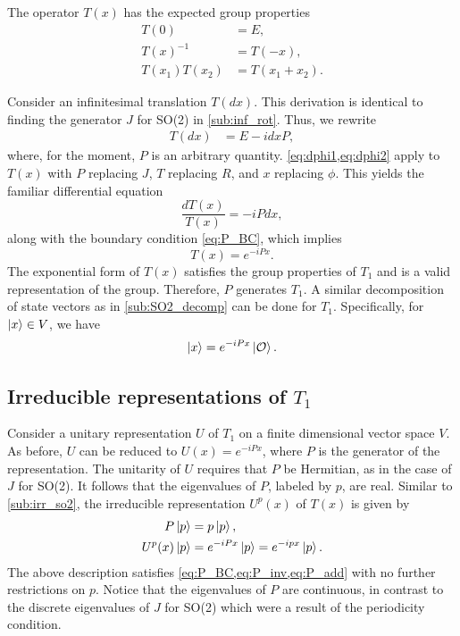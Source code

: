     The operator $T(x)$ has the expected group properties
    \begin{align}
        T(0) &= E, \label{eq:P_BC} \\
        T(x)^{-1} &= T(-x), \label{eq:P_inv}\\
        T(x_1)T(x_2) &= T(x_1+x_2).\label{eq:P_add}
    \end{align}

    Consider an infinitesimal translation $T(dx)$. This derivation is identical to finding the generator $J$ for SO(2) in \cref{sub:inf_rot}. Thus, we rewrite
    \begin{align*}
        T(dx) &= E - i dx P,
    \end{align*}
    where, for the moment, $P$ is an arbitrary quantity. \cref{eq:dphi1,eq:dphi2} apply to $T(x)$ with $P$ replacing $J$, $T$ replacing $R$, and $x$ replacing $\phi$. This yields the familiar differential equation
    \begin{equation}
        \frac{dT(x)}{T(x)} = -iP dx,
    \end{equation}
    along with the boundary condition \cref{eq:P_BC}, which implies
    \begin{equation}
        T(x) = e^{-iPx}.
    \end{equation}
    The exponential form of $T(x)$ satisfies the group properties of $T_1$ and is a valid representation of the group. Therefore, $P$ generates $T_1$. A similar decomposition of state vectors as in \cref{sub:SO2_decomp} can be done for $T_1$. Specifically, for $\ket{x}\in V$, we have
    \begin{align*}
        \ket{x} = e^{-iPx}\ket{\mathcal{O}}.
    \end{align*}

    \subsection{Irreducible representations of $T_1$}
    Consider a unitary representation $U$ of $T_1$ on a finite dimensional vector space $V$. As before, $U$ can be reduced to $U(x) = e^{-iPx}$, where $P$ is the generator of the representation. The unitarity of $U$ requires that $P$ be Hermitian, as in the case of $J$ for SO(2). It follows that the eigenvalues of $P$, labeled by $p$, are real. Similar to \cref{sub:irr_so2}, the irreducible representation $U^p(x)$ of $T(x)$ is given by
    \begin{align*}
        P\ket{p} &= p\ket{p}, \\
        U^p(x)\ket{p} &= e^{-iPx}\ket{p} = e^{-ip x}\ket{p}.
    \end{align*}
    The above description satisfies \cref{eq:P_BC,eq:P_inv,eq:P_add} with no further restrictions on $p$. Notice that the eigenvalues of $P$ are continuous, in contrast to the discrete eigenvalues of $J$ for SO(2) which were a result of the periodicity condition.

